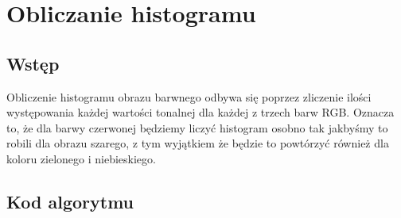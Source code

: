 \documentclass[a4paper,12pt]{book}
\begin{document}
\section{Obliczanie histogramu}
\subsection*{Wstęp}
Obliczenie histogramu obrazu barwnego odbywa się poprzez zliczenie ilości występowania każdej wartości tonalnej dla każdej z trzech barw RGB. Oznacza to, że dla barwy czerwonej będziemy liczyć histogram osobno tak jakbyśmy to robili dla obrazu szarego, z tym wyjątkiem że będzie to powtórzyć również dla koloru zielonego i niebieskiego. 

\subsection*{Kod algorytmu}
\end{document}

